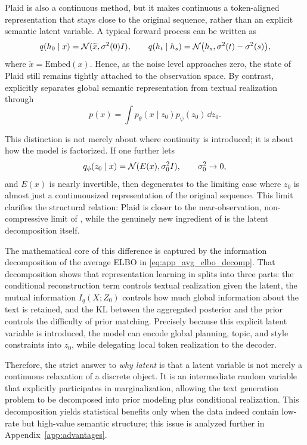 Plaid is also a continuous method, but it makes continuous a token-aligned representation that stays close to the original sequence, rather than an explicit semantic latent variable. A typical forward process can be written as
\begin{equation}
q(h_0\mid x)=\mathcal{N}(\widetilde x,\sigma^2(0)I),
\qquad
q(h_t\mid h_s)=\mathcal{N}\bigl(h_s,\sigma^2(t)-\sigma^2(s)\bigr),
\label{eq:app_plaid_forward}
\end{equation}
where $\widetilde x=\mathrm{Embed}(x)$. Hence, as the noise level approaches zero, the state of Plaid still remains tightly attached to the observation space. By contrast, \method explicitly separates global semantic representation from textual realization through
\begin{equation}
p(x)=\int p_{\theta}(x\mid z_0)p_{\psi}(z_0)\,\dd z_0.
\label{eq:app_px_independent_of_encoder}
\end{equation}

This distinction is not merely about where continuity is introduced; it is about how the model is factorized. If one further lets
\begin{equation}
q_{\phi}(z_0\mid x)=\mathcal{N}(E(x),\sigma_0^2I),
\qquad
\sigma_0^2\to 0,
\label{eq:app_plaid_as_limit}
\end{equation}
and $E(x)$ is nearly invertible, then \method degenerates to the limiting case where $z_0$ is almost just a continuousized representation of the original sequence. This limit clarifies the structural relation: Plaid is closer to the near-observation, non-compressive limit of \method, while the genuinely new ingredient of \method is the latent decomposition itself.

The mathematical core of this difference is captured by the information decomposition of the average ELBO in \eqref{eq:app_avg_elbo_decomp}. That decomposition shows that representation learning in \method splits into three parts: the conditional reconstruction term controls textual realization given the latent, the mutual information $I_q(X;Z_0)$ controls how much global information about the text is retained, and the KL between the aggregated posterior and the prior controls the difficulty of prior matching. Precisely because this explicit latent variable is introduced, the model can encode global planning, topic, and style constraints into $z_0$, while delegating local token realization to the decoder.

Therefore, the strict answer to \emph{why latent} is that a latent variable is not merely a continuous relaxation of a discrete object. It is an intermediate random variable that explicitly participates in marginalization, allowing the text generation problem to be decomposed into prior modeling plus conditional realization. This decomposition yields statistical benefits only when the data indeed contain low-rate but high-value semantic structure; this issue is analyzed further in Appendix~\ref{app:advantages}.

